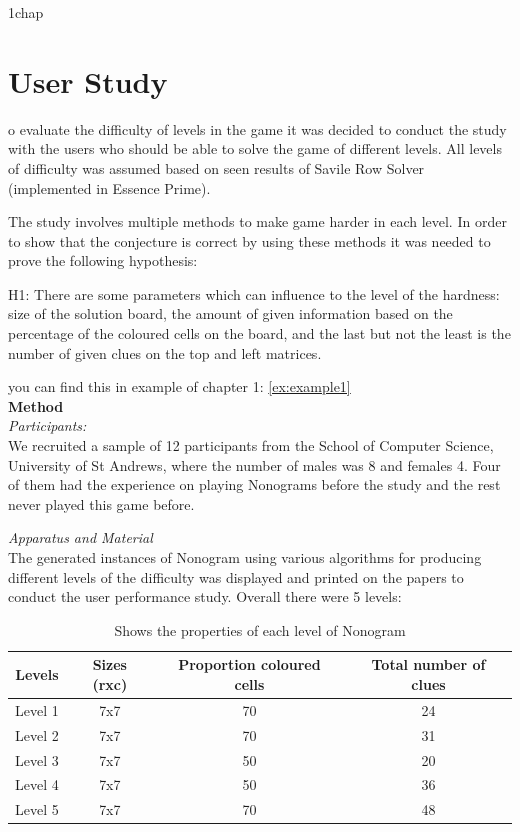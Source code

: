  {1chap}
\let\textcircled=\pgftextcircled
\chapter{User Study}
\label{chap:8}

o evaluate the difficulty of levels in the game it was decided to conduct the study with the users who should be able to solve the game of different levels. All levels of difficulty was assumed based on seen results of Savile Row Solver (implemented in Essence Prime).

The study involves multiple methods to make game harder in each level. In order to show that the conjecture is correct by using these methods it was needed to prove the following hypothesis:

H1: There are some parameters which can influence to the level of the hardness: size of the solution board, the amount of given information based on the percentage of the coloured cells on the board, and the last but not the least is the number of given clues on the top and left matrices. 

you can find this in example of chapter 1: \ref{ex:example1}\\
\textbf{Method}\\
\textit{Participants:} \\
We recruited a sample of 12 participants from the School of Computer Science, University of St Andrews, where the number of males was 8 and females 4. 
Four of them had the experience on playing Nonograms before the study and the rest never played this game before.

\textit{Apparatus and Material}\\
The generated instances of Nonogram using various algorithms for producing different levels of the difficulty was displayed and printed on the papers to conduct the user performance study. 
Overall there were 5 levels: 

\begin{table}
\centering
\begin{tabular}{ |c|c|c|c| }
     \hline
     Levels & Sizes (rxc)& Proportion coloured cells & Total number of clues\\ 
     \hline
     Level 1& 7x7 & 70 & 24 \\  
     Level 2& 7x7 & 70 & 31 \\
     Level 3& 7x7 & 50 & 20 \\
     Level 4& 7x7 & 50 & 36 \\
     Level 5& 7x7 & 70 & 48 \\
    \hline
\end{tabular}
\caption{Shows the properties of each level of Nonogram}
\label{table:nonogram_properties}
\end{table}


